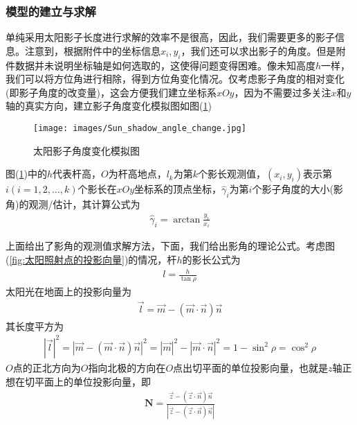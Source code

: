         \subsubsection{模型的建立与求解}
            \par
            单纯采用太阳影子长度进行求解的效率不是很高，因此，我们需要更多的影子信息。注意到，根据附件中的坐标信息$x_i,y_i$，我们还可以求出影子的角度。但是附件数据并未说明坐标轴是如何选取的，这使得问题变得困难。像未知高度$h$一样，我们可以将方位角进行相除，得到方位角变化情况。仅考虑影子角度的相对变化(即影子角度的改变量)，这会方便我们建立坐标系$xOy$，因为不需要过多关注$x$和$y$轴的真实方向，建立影子角度变化模拟图如图(\ref{fig:太阳影子角度变化模拟图})
			\begin{figure}[H]
			\centering
			\texttt{[image: images/Sun\_shadow\_angle\_change.jpg]}
			\caption{太阳影子角度变化模拟图}
			\label{fig:太阳影子角度变化模拟图}
			\end{figure}
            图(\ref{fig:太阳影子角度变化模拟图})中的$h$代表杆高，$O$为杆高地点，$l_k$为第$k$个影长观测值，$(x_i, y_i )$表示第$i(i=1,2,\dots,k)$个影长在$xOy$坐标系的顶点坐标，$\hat{\gamma}_i$为第$i$个影子角度的大小(影角)的观测/估计，其计算公式为
            \begin{align*}
            \hat{\gamma}_i = \arctan\frac{y_i}{x_i}
            \end{align*}
            \par
            上面给出了影角的观测值求解方法，下面，我们给出影角的理论公式。考虑图(\ref{fig:太阳照射点的投影向量})的情况，杆$h$的影长公式为
            \begin{align*}
            l = \frac{h}{\tan\rho}
            \end{align*}
            太阳光在地面上的投影向量为
            \begin{align*}
            \vec{l} = \vec{m} - (\vec{m}\cdot \vec{n})\vec{n}
            \end{align*}
            其长度平方为
            \begin{align*}
            |\vec{l}|^2 = |\vec{m} - (\vec{m}\cdot \vec{n})\vec{n}|^2 = |\vec{m}|^2 - |\vec{m}\cdot\vec{n}|^2 = 1-\sin^2\rho = \cos^2\rho
            \end{align*}
            $O$点的正北方向为$O$指向北极的方向在$O$点出切平面的单位投影向量，也就是$z$轴正想在切平面上的单位投影向量，即
            \begin{align*}
            \mathbf{N} = \frac{\vec{z} - (\vec{z}\cdot\vec{n})\vec{n}}{|\vec{z} - (\vec{z}\cdot\vec{n})\vec{n}|}
            \end{align*}
